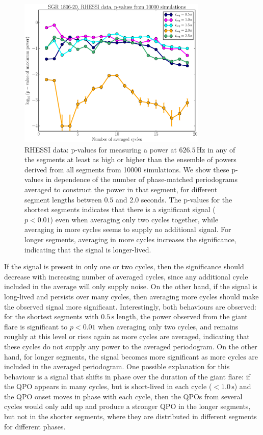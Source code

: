 \documentclass{emulateapj}
\begin{document}
\begin{figure}[htbp]
\begin{center}
\includegraphics[width=9cm]{f4.eps}
\caption{RHESSI data: p-values for measuring a power at $626.5\, \mathrm{Hz}$ in any of the segments at least as high or higher than the ensemble of powers derived from all segments from 10000 simulations. We show these p-values in dependence of the number of phase-matched periodograms averaged to construct the power in that segment, for different segment lengths between $0.5$ and $2.0$ seconds. The p-values for the shortest segments indicates that there is a significant signal ($p < 0.01$) even when averaging only two cycles together, while averaging in more cycles seems to supply no additional signal. For longer segments, averaging in more cycles increases the significance, indicating that the signal is longer-lived.}
\label{fig:rhessi_pvalues}
\end{center}
\end{figure}

If the signal is present in only one or two cycles, then the significance should decrease with increasing number of averaged cycles, since any additional cycle included in the average will only supply noise. On the other hand, if the signal is long-lived and persists over many cycles, then averaging more cycles should make the observed signal more significant. Interestingly, both behaviours are observed: for the shortest segments with $0.5\, \mathrm{s}$ length, the power observed from the giant flare is significant to $p < 0.01$ when averaging only two cycles, and remains roughly at this level or rises again as more cycles are averaged, indicating that these cycles do not supply any power to the averaged periodogram. On the other hand, for longer segments, the signal becomes more significant as more cycles are included in the averaged periodogram. One possible explanation for this behaviour is a signal that shifts in phase over the duration of the giant flare: if the QPO appears in many cycles, but is short-lived in each cycle ($<1.0 \, \mathrm{s}$) and the QPO onset moves in phase with each cycle, then the QPOs from several cycles would only add up and produce a stronger QPO in the longer segments, but not in the shorter segments, where they are distributed in different segments for different phases. 
\end{document}
